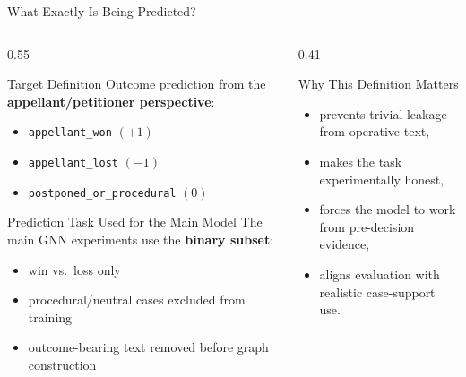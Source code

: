 \documentclass[aspectratio=169,11pt]{beamer}
\newenvironment{tightitemize}{
  \begin{itemize}
    \setlength{\itemsep}{2pt}
    \setlength{\parskip}{0pt}
}{\end{itemize}}
\newcommand{\highlight}[1]{\textcolor{ThesisBlue}{\textbf{#1}}}
\begin{document}
\begin{frame}{What Exactly Is Being Predicted?}
  \small
  \begin{columns}[T]
    \begin{column}{0.55\textwidth}
      \begin{block}{Target Definition}
        Outcome prediction from the \highlight{appellant/petitioner perspective}:
        \begin{tightitemize}
          \item \texttt{appellant\_won} $(+1)$
          \item \texttt{appellant\_lost} $(-1)$
          \item \texttt{postponed\_or\_procedural} $(0)$
        \end{tightitemize}
      \end{block}
      \begin{block}{Prediction Task Used for the Main Model}
        The main GNN experiments use the \highlight{binary subset}:
        \begin{tightitemize}
          \item win vs.\ loss only
          \item procedural/neutral cases excluded from training
          \item outcome-bearing text removed before graph construction
        \end{tightitemize}
      \end{block}
    \end{column}
    \begin{column}{0.41\textwidth}
      \begin{block}{Why This Definition Matters}
        \begin{tightitemize}
          \item prevents trivial leakage from operative text,
          \item makes the task experimentally honest,
          \item forces the model to work from pre-decision evidence,
          \item aligns evaluation with realistic case-support use.
        \end{tightitemize}
      \end{block}
    \end{column}
  \end{columns}
\end{frame}
\end{document}
